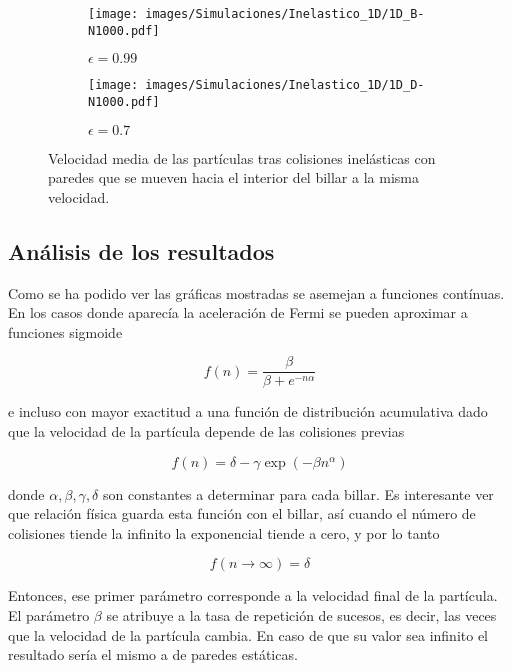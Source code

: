 \documentclass[11pt, spanish]{book}
\newcommand{\cambios}[1]{\textcolor{green!70!black}{#1}}
\begin{document}
\begin{figure}[H]
    \begin{subfigure}[b]{0.5\textwidth}
        \centering
        \texttt{[image: images/Simulaciones/Inelastico\_1D/1D\_B-N1000.pdf]}
        \caption{$\epsilon = 0.99$}
    \end{subfigure}
    \hfill
    \begin{subfigure}[b]{0.5\textwidth}
        \centering
        \texttt{[image: images/Simulaciones/Inelastico\_1D/1D\_D-N1000.pdf]}
        \caption{$\epsilon = 0.7$}
    \end{subfigure}
    \caption{Velocidad media de las partículas tras colisiones inelásticas con paredes que se mueven hacia el interior del billar a la misma velocidad.}
    \label{fig:1D_inelastic_B}
\end{figure}

\subsection{Análisis de los resultados}

Como se ha podido ver las gráficas mostradas se asemejan a funciones contínuas. En los casos donde aparecía la aceleración de Fermi se pueden aproximar a funciones sigmoide

\begin{equation}
    f(n) = \dfrac{\beta}{\beta + e^{-n\alpha}}
\end{equation}

e incluso con mayor exactitud a una función de distribución acumulativa \cambios{dado que la velocidad de la partícula depende de las colisiones previas} 

\begin{equation}\label{eq:acumulativa_general}
    f(n) = \delta - \gamma\exp(-\beta n^\alpha)
\end{equation}

donde \( \alpha, \beta, \gamma, \delta \) son constantes a determinar para cada billar.
\cambios{Es interesante ver que relación física guarda esta función con el billar, así cuando el número de colisiones tiende la infinito la exponencial tiende a cero, y por lo tanto}

\begin{equation}
    f(n \rightarrow \infty) = \delta
\end{equation}

\cambios{Entonces, ese primer parámetro corresponde a la velocidad final de la partícula. El parámetro \( \beta \) se atribuye a la tasa de repetición de sucesos, es decir, las veces que la velocidad de la partícula cambia. En caso de que su valor sea infinito el resultado sería el mismo a de paredes estáticas.}
\end{document}
